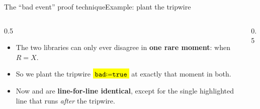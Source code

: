 \ifdefined\PRESENTATION\else\PassOptionsToClass{handout}{beamer}\fi\documentclass[aspectratio=169, lualatex]{beamer}
\begin{document}
\begin{frame}{The ``bad event'' proof technique}{Example: plant the tripwire}
	\begin{columns}[c]
		\begin{column}{0.5\textwidth}
			\begin{itemize}[<+->]
				\item The two libraries can only ever disagree in \textbf{one rare moment}: when $R = X$.
				\item So we plant the tripwire \hl{$\texttt{bad} \coloneq \texttt{true}$} at exactly that moment in both.
				\item Now  and  are \textbf{line-for-line identical}, except for the single highlighted line that runs \textit{after} the tripwire.
			\end{itemize}
		\end{column}
		\begin{column}{0.5\textwidth}
		\end{column}
	\end{columns}
\end{frame}
\end{document}
